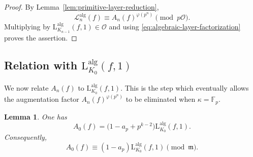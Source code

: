 \documentclass[11pt,table]{amsart}
\newtheorem{lemma}[theorem]{Lemma}
\newcommand{\F}{\mathbb{F}}
\numberwithin{equation}{section}
\begin{document}
\begin{proof}
By Lemma~\ref{lem:primitive-layer-reduction},
\[
        \mathscr L_n^{\operatorname{alg}}(f)
        \equiv
        A_n(f)^{\varphi(p^n)}
        \pmod{p\mathcal O}.
\]
Multiplying by
\(\mathrm{L}_{K_{n-1}}^{\operatorname{alg}}(f,1)\in\mathcal O\) and
using \eqref{eq:algebraic-layer-factorization} proves the assertion.
\end{proof}

\subsection{Relation with $\mathrm{L}_{K_0}^{\operatorname{alg}}(f,1)$}

\par We now relate \(A_n(f)\) to $\mathrm{L}_{K_0}^{\operatorname{alg}}(f,1)$.
This is the step which eventually allows the augmentation factor
$A_n(f)^{\varphi(p^n)}$ to be eliminated when \(\kappa=\F_p\).

\begin{lemma}
\label{lem:A0-bottom}
One has
\begin{equation}
\label{eq:A0-exact-bottom-value}
        A_0(f)
        =
        \bigl(1-a_p+p^{k-2}\bigr)
        \mathrm{L}_{K_0}^{\operatorname{alg}}(f,1).
\end{equation}
Consequently,
\begin{equation}
\label{eq:A0-mod-m-bottom-value}
        A_0(f)
        \equiv
        (1-a_p)
        \mathrm{L}_{K_0}^{\operatorname{alg}}(f,1)
        \pmod{\mathfrak m}.
\end{equation}
\end{lemma}
\end{document}
